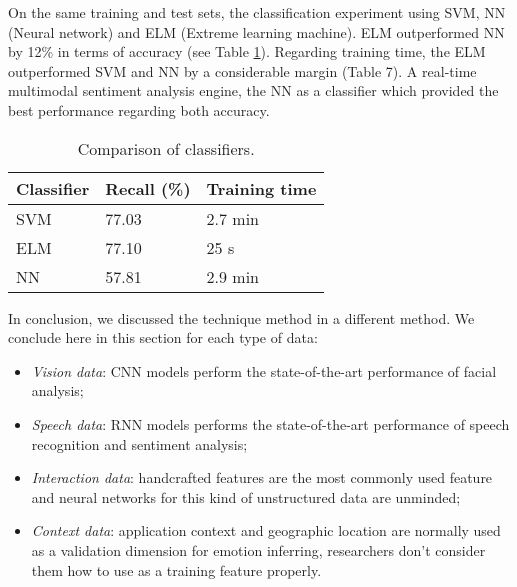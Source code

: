 On the same training and test sets, the classification
experiment using SVM, NN (Neural network) and ELM (Extreme learning machine). ELM outperformed NN by
12\% in terms of accuracy (see Table \ref{tab:classifier}).
Regarding training time, the ELM outperformed SVM and NN
by a considerable margin (Table 7). A real-time multimodal sentiment analysis engine, 
the NN as a classifier which provided the best performance regarding both accuracy.

\begin{table}
  \caption{Comparison of classifiers.}
  \label{tab:classifier}
  \scriptsize
  \begin{center}
    \begin{tabular}{lll}
      Classifier & Recall (\%) & Training time \\
    \hline
    SVM                   & 77.03         &  2.7 min    \\
    ELM                & 77.10         &   25 s    \\
    NN                 & 57.81         &  2.9 min    \\
    \end{tabular}
  \end{center}
\end{table}

In conclusion, we discussed the technique method in a different method. We conclude here in this section for each type of data:

\begin{itemize}
  \item \emph{Vision data}: CNN models perform the state-of-the-art performance of facial analysis;
  \item \emph{Speech data}: RNN models performs the state-of-the-art performance of speech recognition and sentiment analysis;
  \item \emph{Interaction data}: handcrafted features are the most commonly used feature and neural networks for this kind of unstructured data are unminded;
  \item  \emph{Context data}: application context and geographic location are normally used as a validation dimension for emotion inferring, researchers don't consider them how to use as a training feature properly.
\end{itemize}